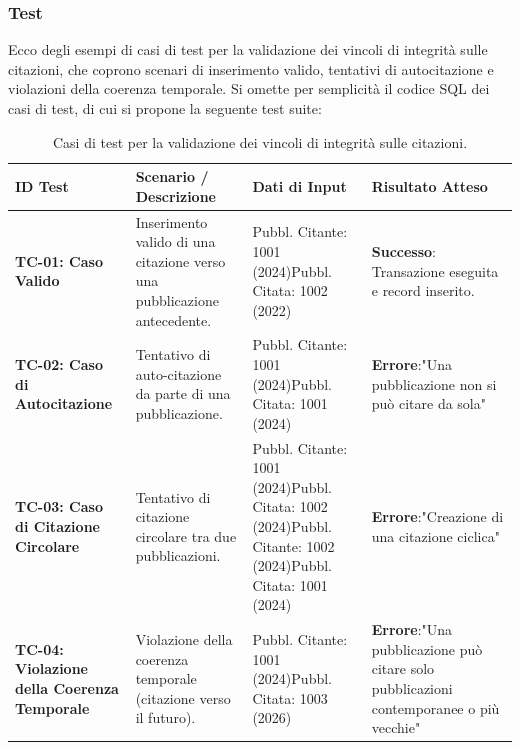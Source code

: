 \documentclass[a4paper,12pt]{article}
\begin{document}
\subsubsection*{Test}
Ecco degli esempi di casi di test per la validazione dei vincoli di integrità sulle citazioni, che coprono scenari di inserimento valido, tentativi di autocitazione e violazioni della coerenza temporale. Si omette per semplicità il codice SQL dei casi di test, di cui si propone la seguente test suite:
\begin{table}[htbp]
\centering
\small
\caption{Casi di test per la validazione dei vincoli di integrità sulle citazioni.}
\label{tab:casi_test_citazioni}
\begin{tabularx}{\textwidth}{X X X X}
\toprule
\textbf{ID Test} & \textbf{Scenario / Descrizione} & \textbf{Dati di Input} & \textbf{Risultato Atteso} \\ 
\midrule
\textbf{TC-01: Caso Valido} & 
Inserimento valido di una citazione verso una pubblicazione antecedente. & 
Pubbl. Citante: 1001 (2024)\newline Pubbl. Citata: 1002 (2022) & 
\textbf{Successo}: Transazione eseguita e record inserito. \\ 
\midrule
\textbf{TC-02: Caso di Autocitazione} & 
Tentativo di auto-citazione da parte di una pubblicazione. & 
Pubbl. Citante: 1001 (2024)\newline Pubbl. Citata: 1001 (2024) & 
\textbf{Errore}:\newline "Una pubblicazione non si può citare da sola" \\ 
\midrule
\textbf{TC-03: Caso di Citazione Circolare} & 
Tentativo di citazione circolare tra due pubblicazioni. & 
Pubbl. Citante: 1001 (2024)\newline Pubbl. Citata: 1002 (2024)\newline Pubbl. Citante: 1002 (2024)\newline Pubbl. Citata: 1001 (2024) & 
\textbf{Errore}:\newline "Creazione di una citazione ciclica" \\ 
\midrule
\textbf{TC-04: Violazione della Coerenza Temporale} & 
Violazione della coerenza temporale (citazione verso il futuro). & 
Pubbl. Citante: 1001 (2024)\newline Pubbl. Citata: 1003 (2026) & 
\textbf{Errore}:\newline "Una pubblicazione può citare solo pubblicazioni contemporanee o più vecchie" \\ 
\bottomrule
\end{tabularx}
\end{table}
\end{document}
